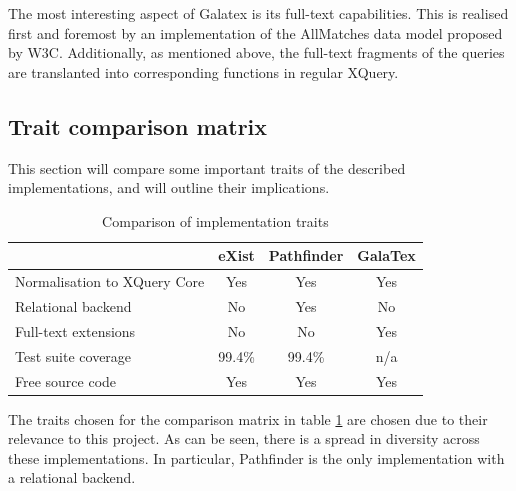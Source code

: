 The most interesting aspect of Galatex is its full-text capabilities. This is
realised first and foremost by an implementation of the AllMatches data model
proposed by W3C\cite{w3c01}. Additionally, as mentioned above, the full-text fragments of the queries are
translanted into corresponding functions in regular XQuery. 

\subsection{Trait comparison matrix}
\label{sect:theory:existing_implementations:comparison}
This section will compare some important traits of the described
implementations, and will outline their implications.
\begin{table}[!h]
	\centering
	\begin{tabular}{ | p{3cm} | c | c | c |}
	\hline
	& eXist & Pathfinder & GalaTex \\ \hline
	Normalisation to XQuery Core & Yes & Yes & Yes \\ \hline
	Relational backend & No & Yes & No \\ \hline
	Full-text extensions & No & No & Yes \\ \hline
	Test suite coverage & 99.4\% & 99.4\% & n/a \\ \hline
	Free source code & Yes & Yes & Yes  \\
	\hline
	\end{tabular}
	\caption{Comparison of implementation traits}
	\label{figure:comparison_matrix}
\end{table}
The traits chosen for the comparison matrix in table
\ref{figure:comparison_matrix} are chosen due to their relevance to this
project. As can be seen, there is a spread in diversity across these
implementations. In particular, Pathfinder is the only implementation with a
relational backend.